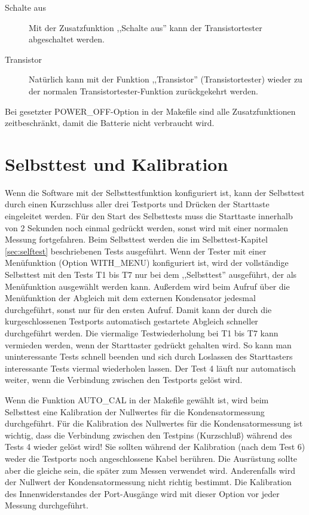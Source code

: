 \begin{description}
 \item[Schalte aus]
Mit der Zusatzfunktion ,,Schalte aus'' kann der Transistortester abgeschaltet werden.\\

 \item[Transistor]
Natürlich kann mit der Funktion ,,Transistor'' (Transistortester) wieder zu der normalen Transistortester-Funktion
zurückgekehrt werden.

\end{description}

Bei gesetzter POWER\_OFF-Option in der Makefile sind alle Zusatzfunktionen zeitbeschränkt, damit die Batterie nicht verbraucht wird.

\section{Selbsttest und Kalibration}

Wenn die Software mit der Selbsttestfunktion konfiguriert ist, kann der Selbsttest durch einen Kurzschluss aller drei
Testports und Drücken der Starttaste eingeleitet werden.
Für den Start des Selbsttests muss die Starttaste innerhalb von 2 Sekunden noch einmal gedrückt werden,
sonst wird mit einer normalen Messung fortgefahren.
Beim Selbsttest werden die im Selbsttest-Kapitel \ref{sec:selftest} beschriebenen Tests ausgeführt.
Wenn der Tester mit einer Menüfunktion (Option WITH\_MENU) konfiguriert ist, 
wird der vollständige Selbsttest mit den Tests T1 bis T7 nur bei dem ,,Selbsttest'' ausgeführt, 
der als Menüfunktion ausgewählt werden kann.
Außerdem wird beim Aufruf über die Menüfunktion der Abgleich mit dem externen Kondensator jedesmal durchgeführt,
sonst nur für den ersten Aufruf.
Damit kann der durch die kurgeschlossenen Testports automatisch gestartete Abgleich schneller durchgeführt werden. 
Die viermalige Testwiederholung bei T1 bis T7 kann vermieden werden, wenn der Starttaster gedrückt gehalten wird.
So kann man uninteressante Tests schnell beenden und
sich durch Loslassen des Starttasters interessante Tests viermal wiederholen lassen.
Der Test 4 läuft nur automatisch weiter, wenn die Verbindung zwischen den Testports gelöst wird.

Wenn die Funktion AUTO\_CAL in der Makefile gewählt ist, wird beim Selbsttest
eine Kalibration der Nullwertes für die Kondensatormessung durchgeführt.
Für die Kalibration des Nullwertes für die Kondensatormessung ist wichtig, 
dass die Verbindung zwischen den Testpins (Kurzschluß) während des Tests 4 wieder gelöst wird!
Sie sollten während der Kalibration (nach dem Test 6) weder die Testports noch angeschlossene Kabel berühren.
Die Ausrüstung sollte aber die gleiche sein, die später zum Messen verwendet wird.
Anderenfalls wird der Nullwert der Kondensatormessung nicht richtig bestimmt.
Die Kalibration des Innenwiderstandes der Port-Ausgänge wird mit dieser Option vor jeder
Messung durchgeführt. \\

